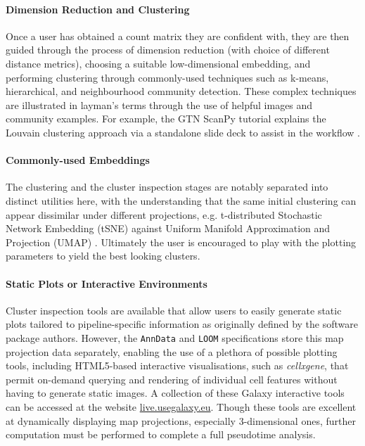 \documentclass[a4paper,num-refs]{oup-contemporary}
\newcommand{\prog}[1]{\textit{#1}} %
\newcommand{\fileformat}[1]{\texttt{#1}} %
\begin{document}
\paragraph{Dimension Reduction and Clustering}
Once a user has obtained a count matrix they are confident with, they are then guided through the process of dimension reduction (with choice of different distance metrics), choosing a suitable low-dimensional embedding, and performing clustering through commonly-used techniques such as k-means, hierarchical, and neighbourhood community detection. These complex techniques are illustrated in layman's terms through the use of helpful images and community examples. For example, the GTN ScanPy tutorial explains the Louvain clustering approach\citep{blondel2008fast} via a standalone slide deck to assist in the workflow \citep{gtnlouvain}.

\paragraph{Commonly-used Embeddings}
The clustering and the cluster inspection stages are notably separated into distinct utilities here, with the understanding that the same initial clustering can appear dissimilar under different projections, e.g. t-distributed Stochastic Network Embedding (tSNE) against Uniform Manifold Approximation and Projection (UMAP) \citep{tsne,umap}. Ultimately the user is encouraged to play with the plotting parameters to yield the best looking clusters. 

\paragraph{Static Plots or Interactive Environments}
Cluster inspection tools are available that allow users to easily generate static plots tailored to pipeline-specific information as originally defined by the software package authors. However, the \fileformat{AnnData} and \fileformat{LOOM} specifications store this map projection data separately, enabling the use of a plethora of possible plotting tools, including HTML5-based interactive visualisations, such as \prog{cellxgene}\citep{cellxgene}, that permit on-demand querying and rendering of individual cell features without having to generate static images. A collection of these Galaxy interactive tools can be accessed at the website \url{live.usegalaxy.eu}.
Though these tools are excellent at dynamically displaying map projections, especially 3-dimensional ones, further computation must be performed to complete a full pseudotime analysis.
\end{document}
